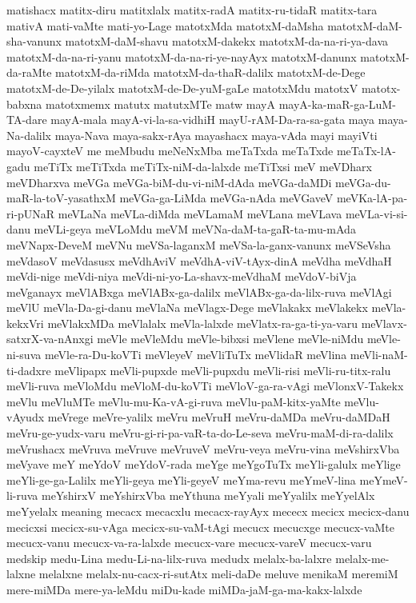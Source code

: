 {matishacx
matitx-diru
matitxlalx
matitx-radA
matitx-ru-tidaR
matitx-tara
mativA
mati-vaMte
mati-yo-Lage
matotxMda
matotxM-daMsha
matotxM-daM-sha-vanunx
matotxM-daM-shavu
matotxM-dakekx
matotxM-da-na-ri-ya-dava
matotxM-da-na-ri-yanu
matotxM-da-na-ri-ye-nayAyx
matotxM-danunx
matotxM-da-raMte
matotxM-da-riMda
matotxM-da-thaR-dalilx
matotxM-de-Dege
matotxM-de-De-yilalx
matotxM-de-De-yuM-gaLe
matotxMdu
matotxV
matotx-babxna
matotxmemx
matutx
matutxMTe
matw
mayA
mayA-ka-maR-ga-LuM-TA-dare
mayA-mala
mayA-vi-la-sa-vidhiH
mayU-rAM-Da-ra-sa-gata
maya
maya-Na-dalilx
maya-Nava
maya-sakx-rAya
mayashacx
maya-vAda
mayi
mayiVti
mayoV-cayxteV
me
meMbudu
meNeNxMba
meTaTxda
meTaTxde
meTaTx-lA-gadu
meTiTx
meTiTxda
meTiTx-niM-da-lalxde
meTiTxsi
meV
meVDharx
meVDharxva
meVGa
meVGa-biM-du-vi-niM-dAda
meVGa-daMDi
meVGa-du-maR-la-toV-yasathxM
meVGa-ga-LiMda
meVGa-nAda
meVGaveV
meVKa-lA-pa-ri-pUNaR
meVLaNa
meVLa-diMda
meVLamaM
meVLana
meVLava
meVLa-vi-si-danu
meVLi-geya
meVLoMdu
meVM
meVNa-daM-ta-gaR-ta-mu-mAda
meVNapx-DeveM
meVNu
meVSa-laganxM
meVSa-la-ganx-vanunx
meVSeVsha
meVdasoV
meVdasusx
meVdhAviV
meVdhA-viV-tAyx-dinA
meVdha
meVdhaH
meVdi-nige
meVdi-niya
meVdi-ni-yo-La-shavx-meVdhaM
meVdoV-biVja
meVganayx
meVlABxga
meVlABx-ga-dalilx
meVlABx-ga-da-lilx-ruva
meVlAgi
meVlU
meVla-Da-gi-danu
meVlaNa
meVlagx-Dege
meVlakakx
meVlakekx
meVla-kekxVri
meVlakxMDa
meVlalalx
meVla-lalxde
meVlatx-ra-ga-ti-ya-varu
meVlavx-satxrX-va-nAnxgi
meVle
meVleMdu
meVle-bibxsi
meVlene
meVle-niMdu
meVle-ni-suva
meVle-ra-Du-koVTi
meVleyeV
meVliTuTx
meVlidaR
meVlina
meVli-naM-ti-dadxre
meVlipapx
meVli-pupxde
meVli-pupxdu
meVli-risi
meVli-ru-titx-ralu
meVli-ruva
meVloMdu
meVloM-du-koVTi
meVloV-ga-ra-vAgi
meVlonxV-Takekx
meVlu
meVluMTe
meVlu-mu-Ka-vA-gi-ruva
meVlu-paM-kitx-yaMte
meVlu-vAyudx
meVrege
meVre-yalilx
meVru
meVruH
meVru-daMDa
meVru-daMDaH
meVru-ge-yudx-varu
meVru-gi-ri-pa-vaR-ta-do-Le-seva
meVru-maM-di-ra-dalilx
meVrushacx
meVruva
meVruve
meVruveV
meVru-veya
meVru-vina
meVshirxVba
meVyave
meY
meYdoV
meYdoV-rada
meYge
meYgoTuTx
meYli-galulx
meYlige
meYli-ge-ga-Lalilx
meYli-geya
meYli-geyeV
meYma-revu
meYmeV-lina
meYmeV-li-ruva
meYshirxV
meYshirxVba
meYthuna
meYyali
meYyalilx
meYyelAlx
meYyelalx
meaning
mecacx
mecacxlu
mecacx-rayAyx
mececx
mecicx
mecicx-danu
mecicxsi
mecicx-su-vAga
mecicx-su-vaM-tAgi
mecucx
mecucxge
mecucx-vaMte
mecucx-vanu
mecucx-va-ra-lalxde
mecucx-vare
mecucx-vareV
mecucx-varu
medskip
medu-Lina
medu-Li-na-lilx-ruva
medudx
melalx-ba-lalxre
melalx-me-lalxne
melalxne
melalx-nu-cacx-ri-sutAtx
meli-daDe
meluve
menikaM
meremiM
mere-miMDa
mere-ya-leMdu
miDu-kade
miMDa-jaM-ga-ma-kakx-lalxde
}
